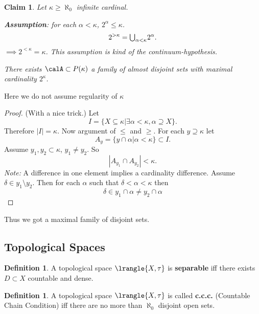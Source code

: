 \documentclass[11pt,pdftex,twoside,a4paper]{article}
\newcommand{\B}[1]{\textbf{#1}}
\newcommand{\ccc}{c.c.c.}
\newtheorem{claim}[thm]{Claim}
\theoremstyle{definition}
\newtheorem{ldef}[thm]{Definition}
\begin{document}
\begin{claim}
Let \(\kappa \geq \aleph_0\) infinite cardinal.

\B{Assumption}: for each \(\alpha < \kappa\), \(2^\alpha \leq \kappa\).
\begin{equation*}
2^{>\kappa} = \mathsmaller{\bigcup_{\alpha < \kappa}}2^\alpha.
\end{equation*}
\(\implies 2^{<\kappa} = \kappa\).
This assumption is kind of the continuum-hypothesis.

There exists \(\calA \subset P(\kappa)\) a family of almost disjoint sets
with maximal cardinality \(2^\kappa\).
\end{claim}
Here we do not assume regularity of \(\kappa\)
\begin{proof}
(With a nice trick.)
Let
\begin{equation*}
I = \{X \subseteq \kappa | \exists \alpha < \kappa, \alpha \supseteq X\}.
\end{equation*}
Therefore \(|I| = \kappa\).
Now argument of \(\leq\) and \(\geq\).
For each \(y \supseteq \kappa\) let
\begin{equation*}
A_y = \{y \cap \alpha | \alpha < \kappa\} \subset I.
\end{equation*}
Assume \(y_1,y_2 \subset \kappa\), \(y_1 \neq y_2\).
So 
\begin{equation*}
 |A_{y_1} \cap A_{y_2}| < \kappa.
\end{equation*}
\emph{Note:} A difference in one element implies a cardinality difference.
Assume \(\delta \in y_1 \setminus y_2\). Then for each \(\alpha\)
such that \(\delta < \alpha < \kappa\) then
\begin{equation*}
 \delta \in y_1\cap \alpha \neq y_2 \cap \alpha
\end{equation*}
\end{proof}
Thus we got a maximal family of disjoint sets.

\subsection{Topological Spaces}

\begin{ldef}
A topological space \(\lrangle{X, \tau}\) is \B{separable}
iff there exists \(D\subset X\) countable and dense.
\end{ldef}

\begin{ldef}
A topological space \(\lrangle{X, \tau}\) is called \B{\ccc} 
(Countable Chain Condition) iff there are no more than \(\aleph_0\)
disjoint open sets.
\end{ldef}
\end{document}
